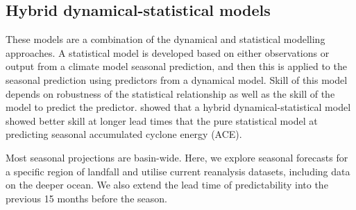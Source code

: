 \subsection{Hybrid dynamical-statistical models}  
These models are a combination of the dynamical and statistical modelling approaches. A statistical model is developed based on either observations or output from a climate model seasonal prediction, and then this is applied to the seasonal prediction using predictors from a dynamical model. Skill of this model depends on robustness of the statistical relationship as well as the skill of the model to predict the predictor. \cite{zhan2016cfsv2} showed that a hybrid dynamical-statistical model showed better skill at longer lead times that the pure statistical model at predicting seasonal accumulated cyclone energy (ACE).





Most seasonal projections are basin-wide. Here, we explore seasonal forecasts for a specific region of landfall and utilise current reanalysis datasets, including data on the deeper ocean. We also extend the lead time of predictability into the previous 15 months before the season.%



